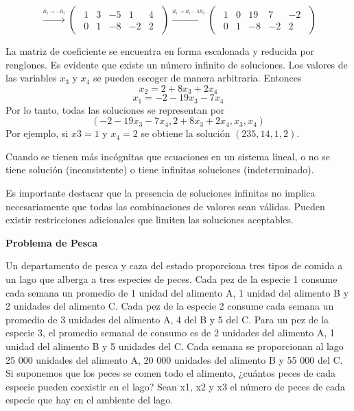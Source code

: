 \documentclass{article}
\begin{document}
\begin{equation*}
    \xrightarrow{\stackrel{R_2 \rightarrow -R_2}{}}
    \begin{pmatrix}
        \begin{array}{rrrr|r}
            1 & 3 & -5 & 1 & 4\\
            0 & 1 & -8 & -2 & 2
        \end{array}
    \end{pmatrix}
\xrightarrow{\stackrel{R_1 \rightarrow R_1 - 3R_2}{}}
    \begin{pmatrix}
        \begin{array}{rrrr|r}
            1 & 0 & 19 & 7 & -2\\
            0 & 1 & -8 & -2 & 2
        \end{array}
    \end{pmatrix}
\end{equation*}

La matriz de coeficiente se encuentra en forma escalonada y reducida por renglones. Es evidente que existe un número infinito de soluciones. Los valores de las variables $x_3$ y $x_4$ se pueden escoger de manera arbitraria. Entonces $$x_2 = 2 + 8x_3 + 2x_4$$ $$x_1 = -2 -19x_3 -7x_4$$ Por lo tanto, todas las soluciones se representan por $$(-2 -19x_3 -7x_4, 2 + 8x_3 + 2x_4, x_3, x_4)$$ Por ejemplo, si $x3 = 1$ y $x_4 = 2$ se obtiene la solución $(235, 14, 1, 2)$.

\begin{tcolorbox}[colback=green!20!white,colframe=green!80!black,title=Soluciones en un Sistema con más Incógnitas que Ecuaciones]
    Cuando se tienen más incógnitas que ecuaciones en un sistema lineal, o no se tiene solución (inconsistente) o tiene infinitas soluciones (indeterminado).

    Es importante destacar que la presencia de soluciones infinitas no implica necesariamente que todas las combinaciones de valores sean válidas. Pueden existir restricciones adicionales que limiten las soluciones aceptables.
\end{tcolorbox}

\begin{large}
    \textbf{Problema de Pesca}
\end{large}

Un departamento de pesca y caza del estado proporciona tres tipos de comida a un lago que alberga a tres especies de peces. Cada pez de la especie 1 consume cada semana un promedio de 1 unidad del alimento A, 1 unidad del alimento B y 2 unidades del alimento C. Cada pez de la especie 2 consume cada semana un promedio de 3 unidades del alimento A, 4 del B y 5 del C. Para un pez de la especie 3, el promedio semanal de consumo es de 2 unidades del alimento A, 1 unidad del alimento B y 5 unidades del C. Cada semana se proporcionan al lago 25 000 unidades del alimento A, 20 000 unidades del alimento B y 55 000 del C. Si suponemos que los peces se comen todo el alimento, ¿cuántos peces de cada especie pueden coexistir en el lago? Sean x1, x2 y x3 el número de peces de cada especie que hay en el ambiente del lago.
\end{document}
